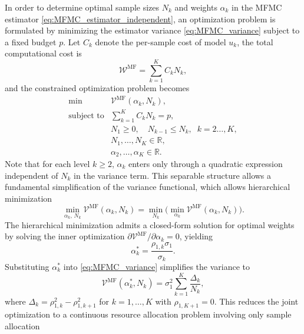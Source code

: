 In order to determine optimal sample sizes $N_k$ and weights $\alpha_k$ in the MFMC estimator \eqref{eq:MFMC_estimator_independent}, an optimization problem is formulated \cite{PeWiGu:2016} by minimizing the estimator variance \eqref{eq:MFMC_variance} subject to a fixed budget $p$. Let $C_k$ denote the per-sample cost of model $u_k$, the total computational cost is 
%
\[
\mathcal{W}^{\text{MF}} = \sum_{k=1}^K C_k N_k,
\]
%
and the constrained optimization problem becomes
%
\begin{equation}\label{eq:Optimization_pb_sample_size}
    \begin{array}{ll}
    \min &\mathcal{V}^{\text{MF}}\left(\alpha_k,N_k\right),\\
       \text{subject to} &\displaystyle\sum\limits_{k=1}^K C_kN_k=p,\\[2pt]
       &\displaystyle N_1\ge 0,\quad \displaystyle N_{k-1}\le N_k, \;\; k=2\ldots,K,\\
       &N_1,\ldots, N_K\in \mathbb{R},\\
       &\alpha_2,\ldots,\alpha_K\in \mathbb{R}.
    \end{array}
\end{equation}
%
Note that for each level $k\ge 2$, $\alpha_k$ enters only through a quadratic expression independent of $N_k$ in the variance term. This separable structure allows a fundamental simplification of the variance functional, which allows hierarchical minimization
%
\begin{equation*}
    \min_{\alpha_k,\, N_k} \mathcal{V}^{\text{MF}}\left(\alpha_k, N_k\right)
    = \min_{N_k}\Big(\min_{\alpha_k} \mathcal{V}^{\text{MF}}(\alpha_k, N_k)\Big).
\end{equation*}
%
The hierarchical minimization admits a closed-form solution for optimal weights by solving the inner optimization $\partial \mathcal{V}^{\text{MF}}/\partial \alpha_k = 0$, yielding 
%
\begin{equation}\label{eq:MFMC_weights}
    \alpha_k^* = \frac{\rho_{1,k}\sigma_1}{\sigma_k}.
\end{equation}
%
Substituting $\alpha_k^*$ into \eqref{eq:MFMC_variance} simplifies the variance to 
%
\begin{equation*}
    \mathcal{V}^{\text{MF}}\left(\alpha_k^*, N_k\right)
    = \sigma_1^2\sum_{k=1}^K \frac{\Delta_k}{N_k},
\end{equation*}
%
where $\Delta_k = \rho_{1,k}^2 - \rho_{1,k+1}^2$ for $k = 1, \dots, K$ with $\rho_{1,K+1}=0$. This reduces the joint optimization to a continuous resource allocation problem involving only sample allocation
